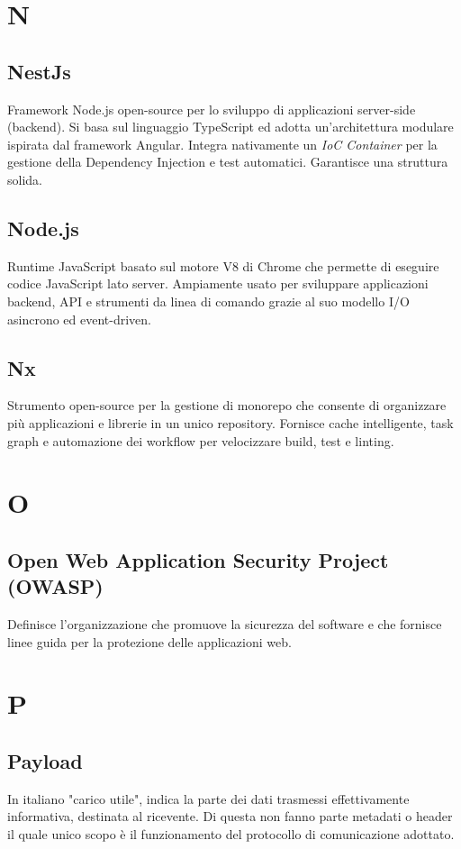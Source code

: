\documentclass[10pt, letterpaper]{article}
\begin{document}
\section{N}

\subsection*{NestJs}
Framework Node.js open-source per lo sviluppo di applicazioni server-side (backend). Si basa sul linguaggio TypeScript ed adotta un'architettura modulare ispirata dal framework Angular. Integra nativamente un \textit{IoC Container} per la gestione della Dependency Injection e test automatici. Garantisce una struttura solida.

\subsection*{Node.js}
Runtime JavaScript basato sul motore V8 di Chrome che permette di eseguire codice JavaScript lato server. Ampiamente usato per sviluppare applicazioni backend, API e strumenti da linea di comando grazie al suo modello I/O asincrono ed event-driven.

\subsection*{Nx}
Strumento open-source per la gestione di monorepo che consente di organizzare più applicazioni e librerie in un unico repository. Fornisce cache intelligente, task graph e automazione dei workflow per velocizzare build, test e linting.

\section{O}

\subsection*{Open Web Application Security Project (OWASP)}
Definisce l'organizzazione che promuove la sicurezza del software e che fornisce linee guida per la protezione delle applicazioni web.

\section{P}

\subsection*{Payload}
In italiano "carico utile", indica la parte dei dati trasmessi effettivamente informativa, destinata al ricevente. Di questa non fanno parte metadati o header il quale unico scopo è il funzionamento del protocollo di comunicazione adottato.
\end{document}
